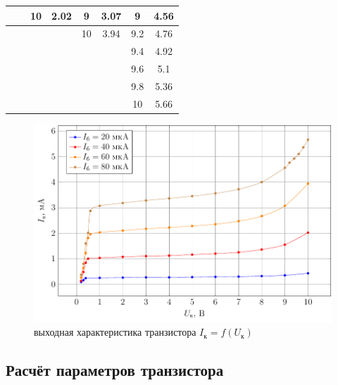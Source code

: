 \begin{table}[htbp]
\begin{tabular}{|c|c|c|c|c|c|c|c|}
		\midrule
		&       & 10    & 2.02  & 9     & 3.07  & 9     & 4.56 \\
		\midrule
		&       &       &       & 10    & 3.94  & 9.2   & 4.76 \\
		\midrule
		&       &       &       &       &       & 9.4   & 4.92 \\
		\midrule
		&       &       &       &       &       & 9.6   & 5.1 \\
		\midrule
		&       &       &       &       &       & 9.8   & 5.36 \\
		\midrule
		&       &       &       &       &       & 10    & 5.66 \\
		\bottomrule
	\end{tabular}%
\end{table}%
\begin{figure}[H]
	\centering
	\includegraphics[width=\linewidth]{plot/plot3}
	\caption{выходная характеристика транзистора $I_\text{к}=f(U_\text{к})$}
	\label{fig:12}
\end{figure}
\subsection{Расчёт параметров транзистора}%


